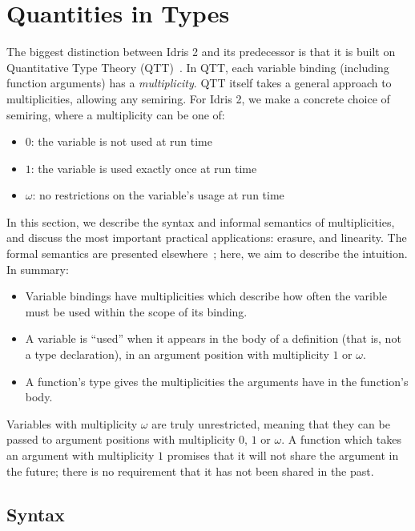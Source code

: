 \section{Quantities in Types}

\label{sec:quantities}

The biggest distinction between Idris 2 and its predecessor is that it is
built on Quantitative Type Theory (QTT)~\cite{nuttin,qtt}. In QTT, each
variable binding (including function arguments) has a \emph{multiplicity}.
QTT itself takes a general approach to multiplicities, allowing any semiring.
For Idris 2, we make a concrete choice of semiring, where a
multiplicity can be one of:

\begin{itemize}
\item $0$: the variable is not used at run time
\item $1$: the variable is used exactly once at run time
\item $\omega$: no restrictions on the variable's usage at run time
\end{itemize}

In this section, we describe the syntax and informal semantics of
multiplicities, and discuss the most important practical applications:
erasure, and linearity. The formal semantics are presented
elsewhere~\cite{qtt}; here, we aim to describe the intuition.
In summary:

\begin{itemize}
\item Variable bindings have multiplicities which describe how often the
varible must be used within the scope of its binding.
\item A variable is ``used'' when it appears in the body of a definition (that
is, not a type declaration), in an argument position with multiplicity $1$ or
$\omega$.
\item A function's type gives the multiplicities the arguments have in the
function's body.
\end{itemize}

Variables with multiplicity $\omega$ are truly unrestricted, meaning that they
can be passed to argument positions with multiplicity $0$, $1$ or $\omega$.
A function which
takes an argument with multiplicity $1$ promises that it will not share the
argument in the future; there is no requirement that it has not been shared
in the past.

\subsection{Syntax}

